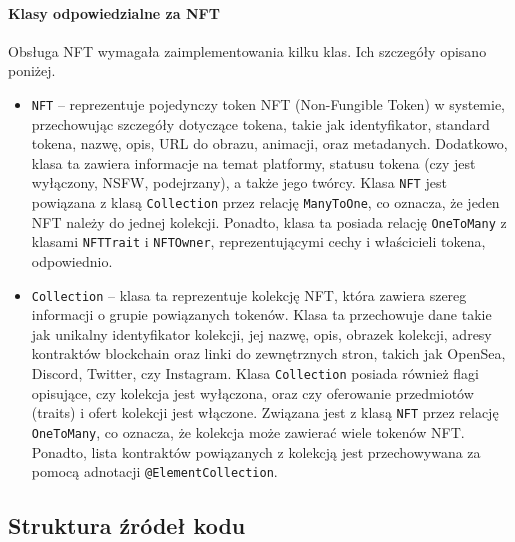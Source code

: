 \paragraph{Klasy odpowiedzialne za NFT}
Obsługa NFT wymagała zaimplementowania kilku klas. Ich szczegóły opisano poniżej.
\begin{itemize}
	\item \texttt{NFT} -- reprezentuje pojedynczy token NFT (Non-Fungible Token) w systemie, przechowując szczegóły dotyczące tokena, takie jak identyfikator, standard tokena, nazwę, opis, URL do obrazu, animacji, oraz metadanych. Dodatkowo, klasa ta zawiera informacje na temat platformy, statusu tokena (czy jest wyłączony, NSFW, podejrzany), a także jego twórcy.\newline
Klasa \texttt{NFT} jest powiązana z klasą \texttt{Collection} przez relację \texttt{ManyToOne}, co oznacza, że jeden NFT należy do jednej kolekcji. Ponadto, klasa ta posiada relację \texttt{OneToMany} z klasami \texttt{NFTTrait} i \texttt{NFTOwner}, reprezentującymi cechy i właścicieli tokena, odpowiednio. 
	\item \texttt{Collection} -- klasa ta reprezentuje kolekcję NFT, która zawiera szereg informacji o grupie powiązanych tokenów. Klasa ta przechowuje dane takie jak unikalny identyfikator kolekcji, jej nazwę, opis, obrazek kolekcji, adresy kontraktów blockchain oraz linki do zewnętrznych stron, takich jak OpenSea, Discord, Twitter, czy Instagram.
\newline
Klasa \texttt{Collection} posiada również flagi opisujące, czy kolekcja jest wyłączona, oraz czy oferowanie przedmiotów (traits) i ofert kolekcji jest włączone. Związana jest z klasą \texttt{NFT} przez relację \texttt{OneToMany}, co oznacza, że kolekcja może zawierać wiele tokenów NFT. Ponadto, lista kontraktów powiązanych z kolekcją jest przechowywana za pomocą adnotacji \texttt{@ElementCollection}.
\end{itemize}

\subsection{Struktura źródeł kodu}
